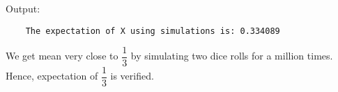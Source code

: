 \documentclass[journal,12pt,twocolumn]{IEEEtran}
\begin{document}
\noindent Output:

\begin{mdframed}[style=codebox]
\lstset{style=mystyle}
\begin{lstlisting}
    The expectation of X using simulations is: 0.334089
\end{lstlisting}
\end{mdframed}

\noindent We get mean very close to $\dfrac{1}{3}$ by simulating two dice rolls for a million times. Hence, expectation of $\dfrac{1}{3}$ is verified.
\end{document}
